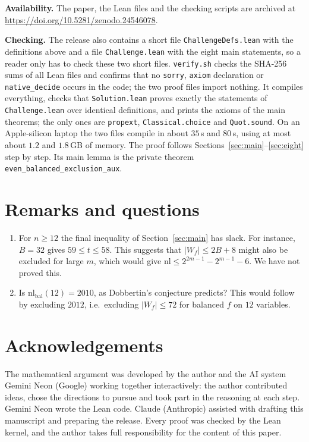 \documentclass[11pt]{amsart}
\theoremstyle{remark}
\newcommand{\W}{W}
\newcommand{\nl}{\mathrm{nl}}
\begin{document}
\noindent\textbf{Availability.} The paper, the Lean files and the checking scripts are archived at
\url{https://doi.org/10.5281/zenodo.24546078}.

\noindent\textbf{Checking.} The release also contains a short file \texttt{ChallengeDefs.lean}
with the definitions above and a file \texttt{Challenge.lean} with the eight main statements, so a
reader only has to check these two short files. \texttt{verify.sh} checks the SHA-256 sums of all
Lean files and confirms that no \texttt{sorry}, \texttt{axiom} declaration or \texttt{native\_decide}
occurs in the code; the two proof files import nothing. It compiles everything, checks that
\texttt{Solution.lean} proves exactly the statements of \texttt{Challenge.lean} over identical
definitions, and prints the axioms of the main
theorems; the only ones are \texttt{propext}, \texttt{Classical.choice} and
\texttt{Quot.sound}. On an Apple-silicon laptop the two files compile in about $35$\,s
and $80$\,s, using at most about $1.2$ and $1.8$\,GB of memory. The proof follows
Sections~\ref{sec:main}--\ref{sec:eight} step by step. Its main lemma is the private theorem
\texttt{even\_balanced\_exclusion\_aux}.

\section{Remarks and questions}

\begin{enumerate}[leftmargin=1.5em]
\item For $n\ge12$ the final inequality of Section~\ref{sec:main} has slack. For instance,
$B=32$ gives $59\le t\le 58$. This suggests that $|\W_f|\le 2B+8$ might also be excluded for large
$m$, which would give $\nl\le 2^{2m-1}-2^{m-1}-6$. We have not proved this.
\item Is $\nl_{\mathrm{bal}}(12)=2010$, as Dobbertin's conjecture predicts? This would follow by
excluding $2012$, i.e.\ excluding $|\W_f|\le 72$ for balanced $f$ on $12$ variables.
\end{enumerate}

\section*{Acknowledgements}
The mathematical argument was developed by the author and the AI system Gemini Neon (Google)
working together interactively: the author contributed ideas, chose the directions to pursue and
took part in the reasoning at each step. Gemini Neon wrote the Lean code. Claude (Anthropic)
assisted with drafting this manuscript and preparing the release. Every proof was checked by the
Lean kernel, and the author takes full responsibility for the content of this paper.
\end{document}
